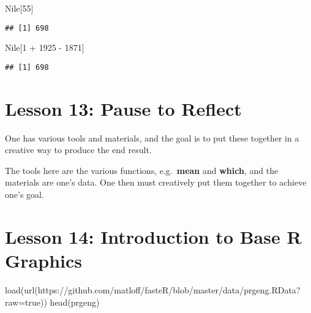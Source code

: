 \documentclass[
]{article}
\newenvironment{Shaded}{\begin{snugshade}}{\end{snugshade}}
\newcommand{\DecValTok}[1]{\textcolor[rgb]{0.00,0.00,0.81}{#1}}
\newcommand{\FunctionTok}[1]{\textcolor[rgb]{0.00,0.00,0.00}{#1}}
\newcommand{\NormalTok}[1]{#1}
\newcommand{\SpecialCharTok}[1]{\textcolor[rgb]{0.00,0.00,0.00}{#1}}
\newcommand{\StringTok}[1]{\textcolor[rgb]{0.31,0.60,0.02}{#1}}
\begin{document}
\begin{Shaded}
\begin{Highlighting}[]
\NormalTok{Nile[}\DecValTok{55}\NormalTok{]}
\end{Highlighting}
\end{Shaded}

\begin{verbatim}
## [1] 698
\end{verbatim}

\begin{Shaded}
\begin{Highlighting}[]
\NormalTok{Nile[}\DecValTok{1} \SpecialCharTok{+} \DecValTok{1925} \SpecialCharTok{{-}} \DecValTok{1871}\NormalTok{]}
\end{Highlighting}
\end{Shaded}

\begin{verbatim}
## [1] 698
\end{verbatim}

\hypertarget{lesson-13-pause-to-reflect}{%
\section{Lesson 13: Pause to Reflect}\label{lesson-13-pause-to-reflect}}

One has various tools and materials, and the goal is to put these
together in a creative way to produce the end result.

The tools here are the various functions, e.g.~\textbf{mean} and
\textbf{which}, and the materials are one's data. One then must
creatively put them together to achieve one's goal.

\hypertarget{lesson-14-introduction-to-base-r-graphics}{%
\section{Lesson 14: Introduction to Base R
Graphics}\label{lesson-14-introduction-to-base-r-graphics}}

\begin{Shaded}
\begin{Highlighting}[]
\FunctionTok{load}\NormalTok{(}\FunctionTok{url}\NormalTok{(}\StringTok{\textquotesingle{}https://github.com/matloff/fasteR/blob/master/data/prgeng.RData?raw=true\textquotesingle{}}\NormalTok{))}
\FunctionTok{head}\NormalTok{(prgeng)}
\end{Highlighting}
\end{Shaded}
\end{document}
